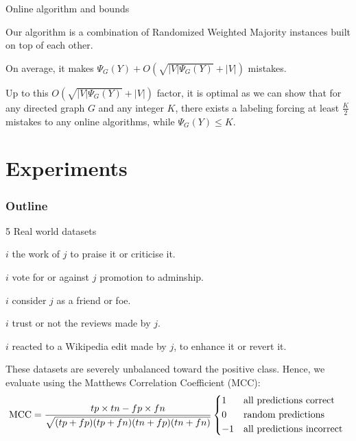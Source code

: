 \documentclass[10pt,svgnames,ignorenonframetext,final]{beamer}
\providecommand{\tightlist}{%
  \setlength{\itemsep}{0pt}\setlength{\parskip}{0pt}}
\begin{document}
\begin{frame}{Online algorithm and bounds}

  Our algorithm is a combination of Randomized Weighted Majority instances built on top of each other. 

  On average, it makes $\Psi_G(Y) + O\left(\sqrt{|V|\Psi_G(Y)} + |V|\right)$ mistakes.

  Up to this $O\left(\sqrt{|V|\Psi_G(Y)} + |V|\right)$ factor, it is optimal as we can show
  that for any directed graph $G$ and any integer $K$,
  there exists a labeling forcing at least $\frac{K}{2}$ mistakes to any online algorithms,
  while $\Psi_G(Y) \leq K$.

\end{frame}


\section{Experiments}\label{experiments}
  \begin{frame} \frametitle{Outline} \tableofcontents[currentsection] \end{frame}

\begin{frame}{5 Real world datasets}

\begin{description}
  \tightlist
\item[\aut{}]
\(i\) the work of \(j\) to praise it or criticise it.

\item[\wik{}]
\(i\) vote for or against \(j\) promotion to adminship.

\item[\sla{}]
\(i\) consider \(j\) as a friend or foe.

\item[\epi{}]
\(i\) trust or not the reviews made by \(j\).

\item[\kiw{}]
\(i\) reacted to a Wikipedia edit made by \(j\), to enhance it or revert it.

\end{description}

These datasets are severely unbalanced toward the positive class.
Hence, we evaluate using the Matthews Correlation Coefficient (MCC):
\[\mathrm{MCC} = \frac{tp\times tn-fp\times fn} {\sqrt{ (tp + fp) ( tp + fn ) ( tn + fp ) ( tn + fn ) } }
 \begin{dcases*}
1 & all predictions correct \\
0 & random predictions \\
-1 & all predictions incorrect \\
\end{dcases*}
\]

\end{frame}
\end{document}

